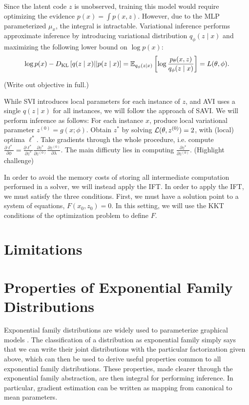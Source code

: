 \documentclass[11pt]{article}
\begin{document}
Since the latent code $z$ is unobserved, training this model would require optimizing the
evidence $p(x) = \int p(x,z)$.
However, due to the MLP parameterized $\mu_x$, the integral is intractable.
Variational inference performs approximate inference by introducing variational distribution
$q_\phi(z \mid x)$ and maximizing the following lower bound on $\log p(x)$:
\begin{equation}
    \log p(x) - D_\mathrm{KL}\left[q(z \mid x) || p(z \mid x)\right]
    = \mathbb{E}_{q_\phi(z \mid x)}\left[\log \frac{p_\theta(x,z)}{q_\phi(z\mid x)}\right] = L(\theta, \phi).
\end{equation}

(Write out objective in full.)

While SVI introduces local parameters for each instance of $z$,
and AVI uses a single $q(z \mid x)$ for all instances,
we will follow the approach of SAVI.
We will perform inference as follows:
For each instance $x$, produce local variational parameter
$z^{(0)} = g(x; \phi)$.
Obtain $z^*$ by solving $\mathcal{L}(\theta, z^{(0)}) = 2$, with (local) optima $\ell^*$.
Take gradients through the whole procedure,
i.e. compute $\frac{\partial \ell^*}{\partial \phi}
= \frac{\partial\ell^*}{\partial z^*}\frac{\partial z^*}{\partial z^{(0)}}
\frac{\partial z^{(0)}}{\partial \lambda}$.
The main difficuty lies in computing $\frac{\partial z^*}{\partial z^{(0)}}$.
(Highlight challenge)

In order to avoid the memory costs of storing all intermediate computation performed
in a solver, we will instead apply the IFT.
In order to apply the IFT, we must satisfy the three conditions.
First, we must have a solution point to a system of equations, $F(x_0, z_0) = 0$.
In this setting, we will use the KKT conditions of the optimization problem to define $F$.

\section{Limitations}



\appendix

\section{Properties of Exponential Family Distributions}
\label{sec:exp-fam}
Exponential family distributions are widely used to parameterize graphical models \citep{vi}.
The classification of a distribution as exponential family simply says that we can write
their joint distributions with the particular factorization given above,
which can then be used to derive useful properties common to all exponential
family distributions.
These properties, made clearer through the exponential family abstraction,
are then integral for performing inference.
In particular, gradient estimation can be written as mapping from
canonical to mean parameters.
\end{document}
